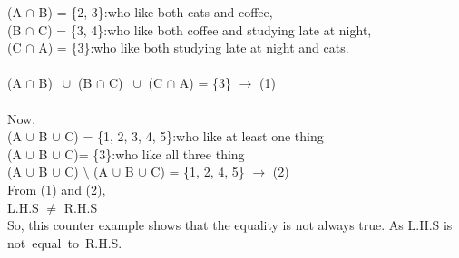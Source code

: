 \documentclass[twoside]{article}
\begin{document}
\begin{enumerate}
            (A $\cap $ B) = \{2, 3\}:who like both cats and coffee,\\  
            (B $\cap$ C) = \{3, 4\}:who like both coffee and studying late at night, \\
            (C $\cap$ A) = \{3\}:who like both studying late at night and cats.\\\\

            (A $\cap $ B) $\ \cup $ (B $\cap$ C) $\ \cup $ (C $\cap$ A) = \{3\} $\to$ (1)\\\\
            Now, \\
            (A $\cup$ B $\cup$ C) = \{1, 2, 3, 4, 5\}:who like at least one thing\\
            (A $\cup$ B $\cup$ C)= \{3\}:who like all three thing\\
            (A $\cup$ B $\cup$ C) $\setminus $ (A $\cup$ B $\cup$ C) = \{1, 2, 4, 5\} $\to$ (2)\\

            From (1) and (2),\\
            L.H.S $\neq$ R.H.S \\

            So, this counter example shows that the equality is not always true. As L.H.S is not equal to R.H.S.


        \end{enumerate}
\
\newpage
\end{document}
